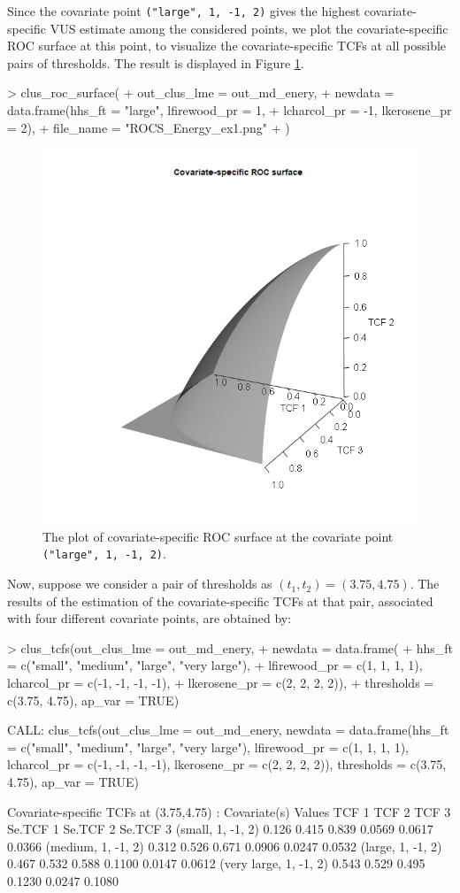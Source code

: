 Since the covariate point \texttt{("large", 1, -1, 2)} gives the highest covariate-specific VUS estimate among the considered points, we plot the covariate-specific ROC surface at this point, to visualize the covariate-specific TCFs at all possible pairs of thresholds. The result is displayed in Figure \ref{fig:ROC-surface-energy}.
\begin{example}
> clus_roc_surface(
+   out_clus_lme = out_md_enery,
+   newdata = data.frame(hhs_ft = "large", lfirewood_pr = 1,
+                        lcharcol_pr = -1, lkerosene_pr = 2),
+   file_name = "ROCS_Energy_ex1.png"
+ )
\end{example}

\begin{figure}[htbp]
\centering 
\includegraphics[width=0.5\linewidth]{ROCS_Energy_ex1} 
\caption{The plot of covariate-specific ROC surface at the covariate point \texttt{("large", 1, -1, 2)}.}
\label{fig:ROC-surface-energy}
\end{figure}

Now, suppose we consider a pair of thresholds as $(t_1, t_2) = (3.75, 4.75)$. The results of the estimation of the covariate-specific TCFs at that pair, associated with four different covariate points, are obtained by:
\begin{example}
> clus_tcfs(out_clus_lme = out_md_enery,
+           newdata = data.frame(
+             hhs_ft = c("small", "medium", "large", "very large"), 
+             lfirewood_pr = c(1, 1, 1, 1), lcharcol_pr = c(-1, -1, -1, -1), 
+             lkerosene_pr = c(2, 2, 2, 2)),
+           thresholds = c(3.75, 4.75), ap_var = TRUE)

CALL: clus_tcfs(out_clus_lme = out_md_enery, newdata = data.frame(hhs_ft = c("small", 
    "medium", "large", "very large"), lfirewood_pr = c(1, 1, 
    1, 1), lcharcol_pr = c(-1, -1, -1, -1), lkerosene_pr = c(2, 
    2, 2, 2)), thresholds = c(3.75, 4.75), ap_var = TRUE)
 
Covariate-specific TCFs at (3.75,4.75) : 
    Covariate(s) Values TCF 1 TCF 2 TCF 3 Se.TCF 1 Se.TCF 2 Se.TCF 3
      (small, 1, -1, 2) 0.126 0.415 0.839   0.0569   0.0617   0.0366
     (medium, 1, -1, 2) 0.312 0.526 0.671   0.0906   0.0247   0.0532
      (large, 1, -1, 2) 0.467 0.532 0.588   0.1100   0.0147   0.0612
 (very large, 1, -1, 2) 0.543 0.529 0.495   0.1230   0.0247   0.1080
\end{example}

